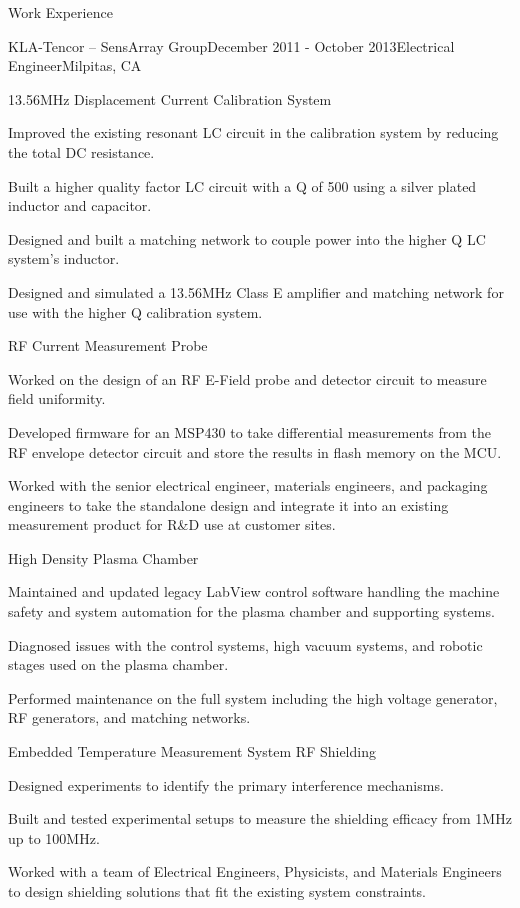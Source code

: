 \documentclass{resume} %
\begin{document}
\begin{rSection}{Work Experience}
\begin{rSubsection2}{KLA-Tencor -- SensArray Group}{December 2011 - October 2013}{Electrical Engineer}{Milpitas, CA}
\pagebreak[2]
\begin{rWorkProject}{13.56MHz Displacement Current Calibration System}
\item Improved the existing resonant LC circuit in the calibration system by reducing the total DC resistance.
\item Built a higher quality factor LC circuit with a Q of 500 using a silver plated inductor and capacitor.
\item Designed and built a matching network to couple power into the higher Q LC system's inductor.
\item Designed and simulated a 13.56MHz Class E amplifier and matching network for use with the higher Q calibration system.
\end{rWorkProject}

\pagebreak[2]
\begin{rWorkProject}{RF Current Measurement Probe}
\item Worked on the design of an RF E-Field probe and detector circuit to measure field uniformity.
\item Developed firmware for an MSP430 to take differential measurements from the RF envelope detector circuit and store the results in flash memory on the MCU.
\item Worked with the senior electrical engineer, materials engineers, and packaging engineers to take the standalone design and integrate it into an existing measurement product for R\&D use at customer sites.
\end{rWorkProject}

\pagebreak[1]
\begin{rWorkProject}{High Density Plasma Chamber}
\item Maintained and updated legacy LabView control software handling the machine safety and system automation for the plasma chamber and supporting systems.
\item Diagnosed issues with the control systems, high vacuum systems, and robotic stages used on the plasma chamber.
\item Performed maintenance on the full system including the high voltage generator, RF generators, and matching networks.
\end{rWorkProject}

\pagebreak[1]
\begin{rWorkProject}{Embedded Temperature Measurement System RF Shielding}
\item Designed experiments to identify the primary interference mechanisms.
\item Built and tested experimental setups to measure the shielding efficacy from 1MHz up to 100MHz.
\item Worked with a team of Electrical Engineers, Physicists, and Materials Engineers to design shielding solutions that fit the existing system constraints.
\end{rWorkProject}


\end{rSubsection2}
\end{rSection}
\end{document}
